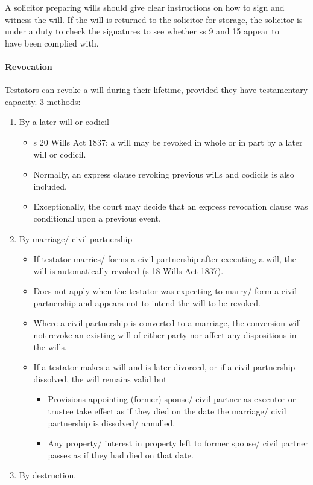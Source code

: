 \documentclass[
]{article}
\providecommand{\tightlist}{%
  \setlength{\itemsep}{0pt}\setlength{\parskip}{0pt}}
\begin{document}
A solicitor preparing wills should give clear instructions on how to
sign and witness the will. If the will is returned to the solicitor for
storage, the solicitor is under a duty to check the signatures to see
whether ss 9 and 15 appear to\\
have been complied with.

\hypertarget{revocation}{%
\paragraph{Revocation}\label{revocation}}

Testators can revoke a will during their lifetime, provided they have
testamentary capacity. 3 methods:

\begin{enumerate}
\def\labelenumi{\arabic{enumi}.}
\tightlist
\item
  By a later will or codicil

  \begin{itemize}
  \tightlist
  \item
    s 20 Wills Act 1837: a will may be revoked in whole or in part by a
    later will or codicil.
  \item
    Normally, an express clause revoking previous wills and codicils is
    also included.
  \item
    Exceptionally, the court may decide that an express revocation
    clause was conditional upon a previous event.
  \end{itemize}
\item
  By marriage/ civil partnership

  \begin{itemize}
  \tightlist
  \item
    If testator marries/ forms a civil partnership after executing a
    will, the will is automatically revoked (s 18 Wills Act 1837).
  \item
    Does not apply when the testator was expecting to marry/ form a
    civil partnership and appears not to intend the will to be revoked.
  \item
    Where a civil partnership is converted to a marriage, the conversion
    will not revoke an existing will of either party nor affect any
    dispositions in the wills.
  \item
    If a testator makes a will and is later divorced, or if a civil
    partnership dissolved, the will remains valid but

    \begin{itemize}
    \tightlist
    \item
      Provisions appointing (former) spouse/ civil partner as executor
      or trustee take effect as if they died on the date the marriage/
      civil partnership is dissolved/ annulled.
    \item
      Any property/ interest in property left to former spouse/ civil
      partner passes as if they had died on that date.
    \end{itemize}
  \end{itemize}
\item
  By destruction.


\end{enumerate}
\end{document}
